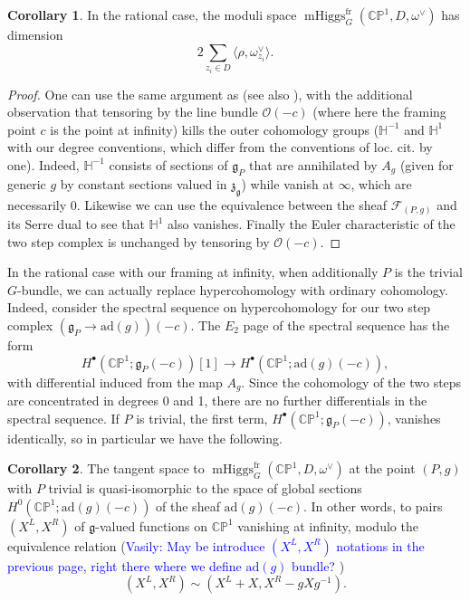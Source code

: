 \documentclass[11pt, oneside, reqno]{amsart}
\theoremstyle{definition} \newtheorem{definition}{Definition}[section]
\newtheorem{corollary}[definition]{Corollary}
\theoremstyle{definition} \newtheorem{remark}[definition]{Remark}
\theoremstyle{definition} \newtheorem{remarks}[definition]{Remarks}
\theoremstyle{definition} \newtheorem{question}[definition]{Question}
\theoremstyle{definition} \newtheorem*{note}{Note}
\theoremstyle{definition} \newtheorem{example}[definition]{Example}
\theoremstyle{definition} \newtheorem{examples}[definition]{Examples}
\renewcommand{\gg}{\mathfrak{g}}
\newcommand{\bb}[1]{\mathbb{#1}}
\newcommand{\mr}[1]{\mathrm{#1}}
\newcommand{\mc}[1]{\mathcal{#1}}
\newcommand{\mf}[1]{\mathfrak{#1}}
\newcommand{\OO}{\mathcal{O}}
\DeclareMathOperator{\mhiggs}{mHiggs}
\newcommand{\fr}{\mathrm{fr}}
\newcommand{\ad}{\mr{ad}}
\newcommand{\vasily}[1]{(\textcolor{blue}{Vasily: #1})}
\begin{document}
\begin{corollary} \label{dim_of_moduli_space_cor}
In the rational case, the moduli space $\mhiggs^\fr_G(\bb{CP}^1, D, \omega^\vee)$ has dimension 
\[2 \sum_{z_i \in D} \langle \rho, \omega^\vee_{z_i} \rangle.\]
\end{corollary}

\begin{proof}
One can use the same argument as \cite{HurtubiseMarkman} (see also \cite[Proposition 5.6]{CharbonneauHurtubise}), with the additional observation that tensoring by the line bundle $\OO(-c)$ (where here the framing point $c$ is the point at infinity) kills the outer cohomology groups ($\bb H^{-1}$ and $\bb H^1$ with our degree conventions, which differ from the conventions of loc. cit. by one).  Indeed, $\bb H^{-1}$ consists of sections of $\gg_P$ that are annihilated by $A_g$ (given for generic $g$ by constant sections valued in $\mf z_{\gg}$) while vanish at $\infty$, which are necessarily 0.  Likewise we can use the equivalence between the sheaf $\mc F_{(P,g)}$ and its Serre dual to see that $\bb H^1$ also vanishes.  Finally the Euler characteristic of the two step complex is unchanged by tensoring by $\OO(-c)$. 
\end{proof}

In the rational case with our framing at infinity, when additionally $P$ is the trivial $G$-bundle, we can actually replace hypercohomology with ordinary cohomology.  Indeed, consider the spectral sequence on hypercohomology for our two step complex $(\gg_P \to \ad(g))(-c)$.  The $E_2$ page of the spectral sequence has the form
\[H^\bullet(\bb{CP}^1; \gg_P(-c))[1] \to H^\bullet(\bb{CP}^1; \ad(g)(-c)),\]
with differential induced from the map $A_g$.  Since the cohomology of the two steps are concentrated in degrees 0 and 1, there are no further differentials in the spectral sequence.  If $P$ is trivial, the first term, $H^\bullet(\bb{CP}^1; \gg_P(-c))$, vanishes identically, so in particular we have the following.

\begin{corollary}
The tangent space to $\mhiggs^\fr_G(\bb{CP}^1, D, \omega^\vee)$ at the point $(P,g)$ with $P$ trivial is quasi-isomorphic to the space of global sections $H^0(\bb{CP}^1; \ad(g)(-c))$ of the sheaf $\ad(g)(-c)$.  In other words, to pairs $(X^L, X^R)$ of $\gg$-valued functions on $\bb{CP}^1$ vanishing at infinity, modulo the equivalence relation \vasily{May be introduce $(X^L, X^R)$ notations in the previous page, right there where we define $\mathrm{ad}(g)$ bundle? }
\begin{equation}\label{eq:equivalence} 
(X^L, X^R) \sim (X^L + X, X^R - gXg^{-1}).
\end{equation}
\end{corollary}
\end{document}
